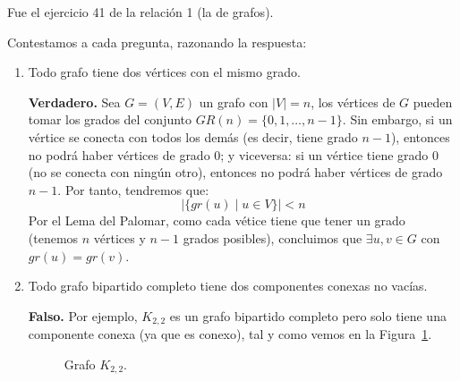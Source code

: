 \documentclass[12pt]{article}
\begin{document}
    \begin{ejercicio}[5 puntos]
        Fue el ejercicio 41 de la relación 1 (la de grafos).
    \end{ejercicio}

    \newpage
    \setcounter{ejercicio}{0}
    \begin{ejercicio}
        Contestamos a cada pregunta, razonando la respuesta:
        \begin{enumerate}
            \item Todo grafo tiene dos vértices con el mismo grado.

                \textbf{Verdadero.} Sea $G=(V,E)$ un grafo con $|V| =n$, los vértices de $G$ pueden tomar los grados del conjunto $GR(n) = \{0,1,\ldots,n-1\}$. Sin embargo, si un vértice se conecta con todos los demás (es decir, tiene grado $n-1$), entonces no podrá haber vértices de grado 0; y viceversa: si un vértice tiene grado 0 (no se conecta con ningún otro), entonces no podrá haber vértices de grado $n-1$. Por tanto, tendremos que:
                \begin{equation*}
                    |\{gr(u) \mid u\in V\}| < n
                \end{equation*}
                Por el Lema del Palomar, como cada vétice tiene que tener un grado (tenemos $n$ vértices y $n-1$ grados posibles), concluimos que $\exists u,v\in G$ con $gr(u) = gr(v)$.

            \item Todo grafo bipartido completo tiene dos componentes conexas no vacías.

                \textbf{Falso.} Por ejemplo, $K_{2,2}$ es un grafo bipartido completo pero solo tiene una componente conexa (ya que es conexo), tal y como vemos en la Figura~\ref{fig:k22}.

                \begin{figure}[H]
                \centering
                \caption{Grafo $K_{2,2}$.}
                \label{fig:k22}
            \end{figure}


\end{enumerate}
\end{ejercicio}
\end{document}
